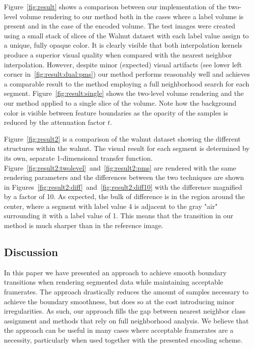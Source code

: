 \documentclass{egpubl}
\begin{document}
Figure~\ref{fig:result} shows a comparison between our implementation of the two-level volume rendering to our method both in the cases where a label volume is present and in the case of the encoded volume. The test images were created using a small stack of slices of the Walnut dataset with each label value assign to a unique, fully opaque color. It is clearly visible that both interpolation kernels produce a superior visual quality when compared with the nearest neighbor interpolation. However, despite minor (expected) visual artifacts (see lower left corner in~\ref{fig:result:dual:pms}) our method performs reasonably well and achieves a comparable result to the method employing a full neighborhood search for each segment. Figure~\ref{fig:result:single} shows the two-level volume rendering and the our method applied to a single slice of the volume. Note how the background color is visible between feature boundaries as the opacity of the samples is reduced by the attenuation factor $t$.

Figure~\ref{fig:result2} is a comparison of the walnut dataset showing the different structures within the walnut. The visual result for each segment is determined by its own, separate 1-dimensional transfer function. Figure~\ref{fig:result2:twolevel}~and~\ref{fig:result2:pms} are rendered with the same rendering parameters and the differences between the two techniques are shown in Figures~\ref{fig:result2:diff}~and~\ref{fig:result2:diff10} with the difference magnified by a factor of 10. As expected, the bulk of difference is in the region around the center, where a segment with label value 4 is adjacent to the gray "air" surrounding it with a label value of 1. This means that the transition in our method is much sharper than in the reference image.



\subsection{Discussion}

In this paper we have presented an approach to achieve smooth boundary transitions when rendering segmented data while maintaining acceptable framerates. The approach drastically reduces the amount of samples necessary to achieve the boundary smoothness, but does so at the cost introducing minor irregularities. As such, our approach fills the gap between nearest neighbor class assignment and methods that rely on full neighborhood analysis. We believe that the approach can be useful in many cases where acceptable framerates are a necessity, particularly when used together with the presented encoding scheme.
\end{document}
